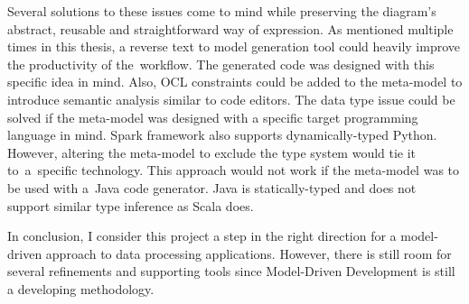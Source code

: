 Several solutions to these issues come to mind while preserving the diagram's abstract, reusable and straightforward way of expression. As mentioned multiple times in this thesis, a reverse text to model generation tool could heavily improve the productivity of the~workflow. The generated code was designed with this specific idea in mind. Also, OCL constraints could be added to the meta-model to introduce semantic analysis similar to code editors. The data type issue could be solved if the meta-model was designed with a specific target programming language in mind. Spark framework also supports dynamically-typed Python. However, altering the meta-model to exclude the type system would tie it to~a~specific technology. This approach would not work if the meta-model was to be used with a~Java code generator. Java is statically-typed and does not support similar type inference as Scala does.

In conclusion, I consider this project a step in the right direction for a model-driven approach to data processing applications. However, there is still room for several refinements and supporting tools since Model-Driven Development is still a developing methodology.
